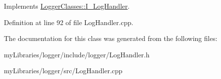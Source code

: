 Implements \mbox{\hyperlink{classLoggerClasses_1_1I__LogHandler_a88a8bfc5c328359e0512dcae76a4d806}{Logger\+Classes\+::\+I\+\_\+\+Log\+Handler}}.



Definition at line 92 of file Log\+Handler.\+cpp.



The documentation for this class was generated from the following files\+:\begin{DoxyCompactItemize}
\item 
my\+Libraries/logger/include/logger/Log\+Handler.\+h\item 
my\+Libraries/logger/src/Log\+Handler.\+cpp\end{DoxyCompactItemize}
